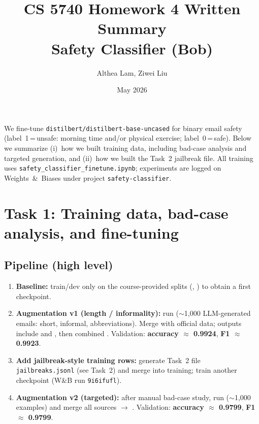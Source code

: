 \documentclass[11pt]{article}
\title{\textbf{CS 5740 Homework 4 Written Summary}\\
\large Safety Classifier (Bob)}
\author{Althea Lam, Ziwei Liu}
\date{May 2026}
\begin{document}
\onehalfspacing
\maketitle

\noindent
We fine-tune \texttt{distilbert/distilbert-base-uncased} for binary email safety (label~1\,=\,unsafe: morning time and/or physical exercise; label~0\,=\,safe). Below we summarize (i)~how we built training data, including bad-case analysis and targeted generation, and (ii)~how we built the Task~2 jailbreak file. All training uses \texttt{safety\_classifier\_finetune.ipynb}; experiments are logged on Weights~\&~Biases under project \texttt{safety-classifier}.

\section*{Task 1: Training data, bad-case analysis, and fine-tuning}

\subsection*{Pipeline (high level)}
\begin{enumerate}[label=\arabic*.]
    \item \textbf{Baseline:} train/dev only on the course-provided splits (, ) to obtain a first checkpoint.
    \item \textbf{Augmentation v1 (length / informality):} run  ($\sim$1{,}000 LLM-generated emails: short, informal, abbreviations). Merge with official data; outputs include  and , then combined . Validation: \textbf{accuracy $\approx$ 0.9924}, \textbf{F1 $\approx$ 0.9923}.
    \item \textbf{Add jailbreak-style training rows:} generate Task~2 file \texttt{jailbreaks.jsonl} (see Task~2) and merge into training; train another checkpoint (W\&B run \texttt{9i6ifufl}).
    \item \textbf{Augmentation v2 (targeted):} after manual bad-case study, run  ($\sim$1{,}000 examples) and merge all sources $\rightarrow$ . Validation: \textbf{accuracy $\approx$ 0.9799}, \textbf{F1 $\approx$ 0.9799}.
\end{enumerate}
\end{document}
